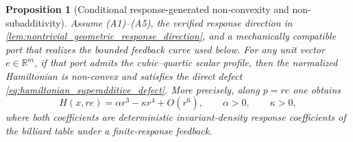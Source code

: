 \documentclass[12pt, letterpaper]{amsart}
\newcommand{\R}{\mathbb{R}}
\theoremstyle{plain}
\newtheorem{proposition}[theorem]{Proposition}
\theoremstyle{definition}
\theoremstyle{remark}
\begin{document}
\begin{proposition}[Conditional response-generated non-convexity and non-subadditivity]
\label{thm:constructive_nonconvex_example}
Assume \textup{(A1)--(A5)}, the verified response direction in
\cref{lem:nontrivial_geometric_response_direction}, and a mechanically
compatible port that realizes the bounded feedback curve used below. For any
unit vector $e\in\R^m$, if that port admits the cubic--quartic scalar profile,
then the normalized Hamiltonian is non-convex and satisfies the direct defect
\eqref{eq:hamiltonian_superadditive_defect}. More precisely, along $p=re$ one
obtains
\begin{equation}
\label{eq:response_generated_cubic_quartic_profile}
    H(x,re)=\alpha r^3-\kappa r^4+O(r^6),
    \qquad \alpha>0,
    \qquad \kappa>0,
\end{equation}
where both coefficients are deterministic invariant-density response
coefficients of the billiard table under a finite-response feedback.
\end{proposition}
\end{document}
